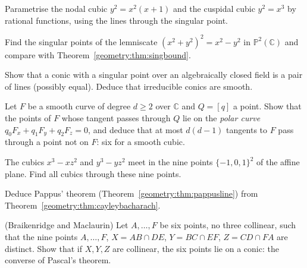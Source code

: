 \begin{exercise}[$\star$]\label{geometry:ex:nodalparam}
Parametrise the nodal cubic $y^2=x^2(x+1)$ and the cuspidal cubic $y^2=x^3$ by rational functions, using the lines through the singular point.
\end{exercise}

\begin{exercise}[$\star\star$]\label{geometry:ex:lemniscate}
Find the singular points of the lemniscate $(x^2+y^2)^2=x^2-y^2$ in $\mathbb P^2(\mathbb C)$ and compare with Theorem~\ref{geometry:thm:singbound}.
\end{exercise}

\begin{exercise}[$\star$]\label{geometry:ex:irreducibleconic}
Show that a conic with a singular point over an algebraically closed field is a pair of lines (possibly equal). Deduce that irreducible conics are smooth.
\end{exercise}

\begin{exercise}[$\star\star$]\label{geometry:ex:polarcurve}
Let $F$ be a smooth curve of degree $d\ge2$ over $\mathbb C$ and $Q=[q]$ a point. Show that the points of $F$ whose tangent passes through $Q$ lie on the
\emph{polar curve} $q_0F_x+q_1F_y+q_2F_z=0$, and deduce that at most $d(d-1)$ tangents to $F$ pass through a point not on $F$: six for a smooth cubic.
\end{exercise}

\begin{exercise}[$\star$]\label{geometry:ex:cramergrid}
The cubics $x^3-xz^2$ and $y^3-yz^2$ meet in the nine points $\{-1,0,1\}^2$ of the affine plane. Find all cubics through these nine points.
\end{exercise}

\begin{exercise}[$\star\star$]\label{geometry:ex:cbpappus}
Deduce Pappus' theorem (Theorem~\ref{geometry:thm:pappusline}) from Theorem~\ref{geometry:thm:cayleybacharach}.
\end{exercise}

\begin{exercise}[$\star\star\star$]\label{geometry:ex:braikenridge}
(Braikenridge and Maclaurin) Let $A,\dots,F$ be six points, no three collinear, such that the nine points $A,\dots,F$, $X=AB\cap DE$, $Y=BC\cap EF$,
$Z=CD\cap FA$ are distinct. Show that if $X,Y,Z$ are collinear, the six points lie on a conic: the converse of Pascal's theorem.
\end{exercise}

